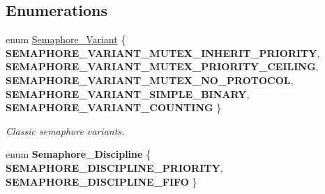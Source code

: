 \subsection*{Enumerations}
\begin{DoxyCompactItemize}
\item 
enum \mbox{\hyperlink{group__ClassicSemImpl_gab9531c36f1845c14f2dfc5006fd3dee9}{Semaphore\+\_\+\+Variant}} \{ \newline
{\bfseries S\+E\+M\+A\+P\+H\+O\+R\+E\+\_\+\+V\+A\+R\+I\+A\+N\+T\+\_\+\+M\+U\+T\+E\+X\+\_\+\+I\+N\+H\+E\+R\+I\+T\+\_\+\+P\+R\+I\+O\+R\+I\+TY}, 
{\bfseries S\+E\+M\+A\+P\+H\+O\+R\+E\+\_\+\+V\+A\+R\+I\+A\+N\+T\+\_\+\+M\+U\+T\+E\+X\+\_\+\+P\+R\+I\+O\+R\+I\+T\+Y\+\_\+\+C\+E\+I\+L\+I\+NG}, 
{\bfseries S\+E\+M\+A\+P\+H\+O\+R\+E\+\_\+\+V\+A\+R\+I\+A\+N\+T\+\_\+\+M\+U\+T\+E\+X\+\_\+\+N\+O\+\_\+\+P\+R\+O\+T\+O\+C\+OL}, 
{\bfseries S\+E\+M\+A\+P\+H\+O\+R\+E\+\_\+\+V\+A\+R\+I\+A\+N\+T\+\_\+\+S\+I\+M\+P\+L\+E\+\_\+\+B\+I\+N\+A\+RY}, 
\newline
{\bfseries S\+E\+M\+A\+P\+H\+O\+R\+E\+\_\+\+V\+A\+R\+I\+A\+N\+T\+\_\+\+C\+O\+U\+N\+T\+I\+NG}
 \}
\begin{DoxyCompactList}\small\item\em Classic semaphore variants. \end{DoxyCompactList}\item 
\mbox{\label{group__ClassicSemImpl_ga6cf684e3f96371bcf89732c68adf1ef0}} 
enum {\bfseries Semaphore\+\_\+\+Discipline} \{ {\bfseries S\+E\+M\+A\+P\+H\+O\+R\+E\+\_\+\+D\+I\+S\+C\+I\+P\+L\+I\+N\+E\+\_\+\+P\+R\+I\+O\+R\+I\+TY}, 
{\bfseries S\+E\+M\+A\+P\+H\+O\+R\+E\+\_\+\+D\+I\+S\+C\+I\+P\+L\+I\+N\+E\+\_\+\+F\+I\+FO}
 \}
\end{DoxyCompactItemize}

